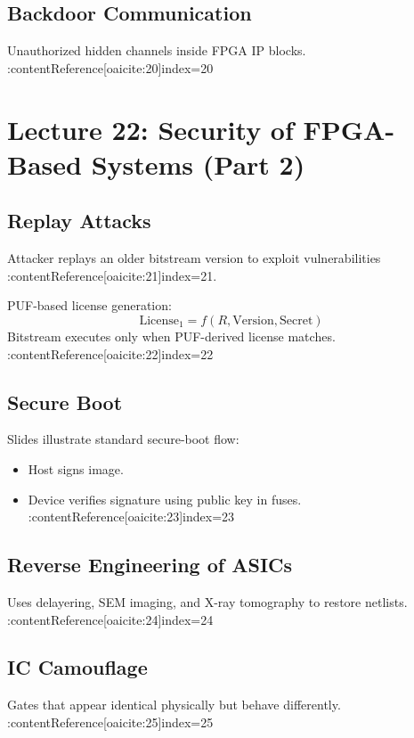 \documentclass[11pt]{article}
\begin{document}
\subsection{Backdoor Communication}
Unauthorized hidden channels inside FPGA IP blocks. :contentReference[oaicite:20]{index=20}

\newpage

\section{Lecture 22: Security of FPGA-Based Systems (Part 2)}

\subsection{Replay Attacks}
Attacker replays an older bitstream version to exploit vulnerabilities
:contentReference[oaicite:21]{index=21}.

PUF-based license generation:
\[
\text{License}_1 = f(R, \text{Version}, \text{Secret})
\]
Bitstream executes only when PUF-derived license matches. :contentReference[oaicite:22]{index=22}

\subsection{Secure Boot}
Slides illustrate standard secure-boot flow:
\begin{itemize}
    \item Host signs image.
    \item Device verifies signature using public key in fuses. :contentReference[oaicite:23]{index=23}
\end{itemize}

\subsection{Reverse Engineering of ASICs}
Uses delayering, SEM imaging, and X-ray tomography to restore netlists. :contentReference[oaicite:24]{index=24}

\subsection{IC Camouflage}
Gates that appear identical physically but behave differently. :contentReference[oaicite:25]{index=25}
\end{document}
